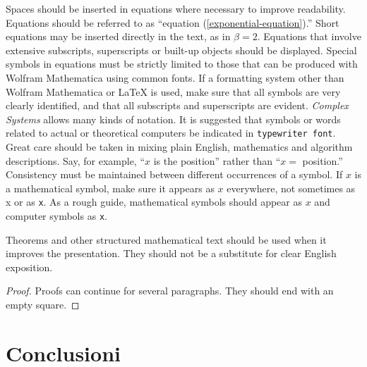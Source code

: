 \documentclass{article}
\begin{document}
Spaces should be inserted in equations where necessary to improve readability. Equations should be referred to as {``}equation (\ref{exponential-equation}).{''} Short equations may be inserted directly in the text, as in \(\beta =2\). Equations that involve extensive subscripts, superscripts or built-up objects should be displayed. Special symbols in equations must be strictly limited to those that can be produced with Wolfram Mathematica using common fonts.
If a formatting system other than Wolfram Mathematica or LaTeX is used, make sure that all symbols are very clearly identified, and that all subscripts and superscripts are evident. \textit{Complex Systems} allows many kinds of notation. It is suggested that symbols or words related to actual or theoretical computers be indicated in \texttt{typewriter font}. 
Great care should be taken in mixing plain English, mathematics and algorithm descriptions. Say, for example, {``}\(x\) is the position{''} rather than {``}\(x=\) position.{''} Consistency must be maintained between different occurrences of a symbol. If \(x\) is a mathematical symbol, make sure it appears as \(x\) everywhere, not sometimes as x or as \texttt{x}. As a rough guide, mathematical symbols should appear as \(x\) and computer symbols as \texttt{x}. 
\begin{theorem}
Theorems and other structured mathematical text should be used when it improves the presentation. They should not be a substitute for clear English exposition. 
\end{theorem}
\begin{proof}
Proofs can continue for several paragraphs. They should end with an empty square.
\end{proof}
\section{Conclusioni}
\end{document}
